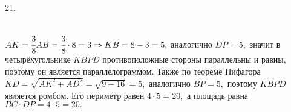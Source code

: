 21. \begin{figure}[ht!]
\end{figure}\\
$AK=\cfrac{3}{8}AB=\cfrac{3}{8}\cdot8=3\Rightarrow KB=8-3=5,$ аналогично $DP=5,$ значит в четырёхугольнике $KBPD$ противоположные стороны параллельны и равны, поэтому он является параллелограммом. Также по теореме Пифагора $KD=\sqrt{AK^2+AD^2}=\sqrt{9+16}=5,$ аналогично $BP=5,$ поэтому $KBPD$ является ромбом. Его периметр равен $4\cdot5=20,$ а площадь равна $BC\cdot DP=4\cdot5=20.$\\
